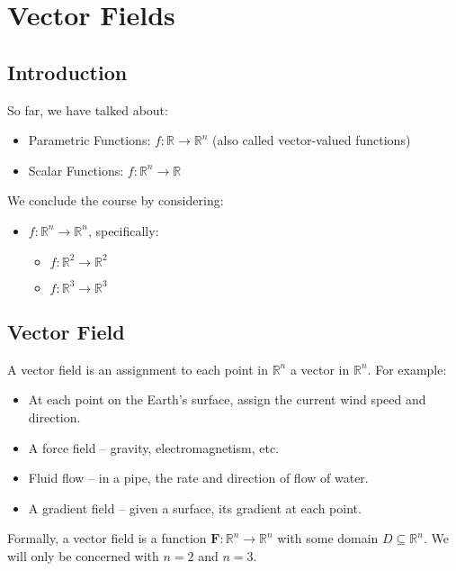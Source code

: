 \section{Vector Fields}

\subsection{Introduction}
So far, we have talked about:

\begin{itemize}
    \item Parametric Functions: \(f \colon \mathbb{R} \to \mathbb{R}^n\) (also called vector-valued functions)
    \item Scalar Functions: \(f \colon \mathbb{R}^n \to \mathbb{R}\)
\end{itemize}

We conclude the course by considering:

\begin{itemize}
    \item \(f \colon \mathbb{R}^n \to \mathbb{R}^n\), specifically:
    \begin{itemize}
        \item \(f \colon \mathbb{R}^2 \to \mathbb{R}^2\)
        \item \(f \colon \mathbb{R}^3 \to \mathbb{R}^3\)
    \end{itemize}
\end{itemize}

\subsection{Vector Field}
A vector field is an assignment to each point in \(\mathbb{R}^n\) a vector in \(\mathbb{R}^n\). For example:

\begin{itemize}
    \item At each point on the Earth's surface, assign the current wind speed and direction.
    \item A force field – gravity, electromagnetism, etc.
    \item Fluid flow – in a pipe, the rate and direction of flow of water.
    \item A gradient field – given a surface, its gradient at each point.
\end{itemize}

Formally, a vector field is a function \(\mathbf{F} : \mathbb{R}^n \to \mathbb{R}^n\) with some domain \(D \subseteq \mathbb{R}^n\). We will only be concerned with \(n = 2\) and \(n = 3\). \\

